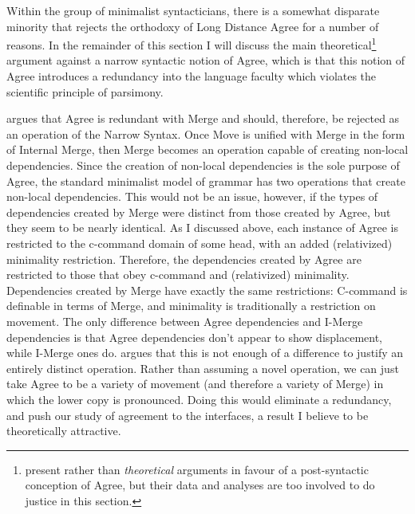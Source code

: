 Within the group of minimalist syntacticians, there is a somewhat disparate minority that rejects the orthodoxy of Long Distance Agree for a number of reasons.
In the remainder of this section I will discuss the main theoretical\footnote{
	\textcite{bobaljik2008wheres,arregi2013contextual} present \textcite{empirical} rather than \textit{theoretical} arguments in favour of a post-syntactic conception of Agree, but their data and analyses are too involved to do justice in this section. 
} argument against a narrow syntactic notion of Agree, which is that this notion of Agree introduces a redundancy into the language faculty which violates the scientific principle of parsimony.

\textcite{hornstein2009theory} argues that Agree is redundant with Merge and should, therefore, be rejected as an operation of the Narrow Syntax.
Once Move is unified with Merge in the form of Internal Merge, then Merge becomes an operation capable of creating non-local dependencies.
Since the creation of non-local dependencies is the sole purpose of Agree, the standard minimalist model of grammar has two operations that create non-local dependencies.
This would not be an issue, however, if the types of dependencies created by Merge were distinct from those created by Agree, but they seem to be nearly identical.
As I discussed above, each instance of Agree is restricted to the c-command domain of some head, with an added (relativized) minimality restriction.
Therefore, the dependencies created by Agree are restricted to those that obey c-command and (relativized) minimality.
Dependencies created by Merge have exactly the same restrictions:
C-command is definable in terms of Merge, and minimality is traditionally a restriction on movement.
The only difference between Agree dependencies and I-Merge dependencies is that Agree dependencies don't appear to show displacement, while I-Merge ones do.
\textcite{hornstein2009theory} argues that this is not enough of a difference to justify an entirely distinct operation.
Rather than assuming a novel operation, we can just take Agree to be a variety of movement (and therefore a variety of Merge) in which the lower copy is pronounced.
Doing this would eliminate a redundancy, and push our study of agreement to the interfaces, a result I believe to be theoretically attractive.


